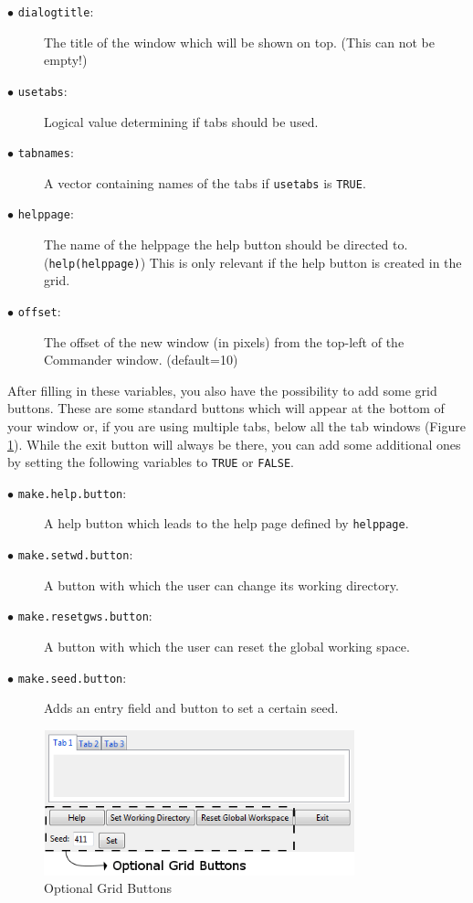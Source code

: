 \documentclass[a4paper]{article}\usepackage[]{graphicx}\usepackage[]{color}
\begin{document}
\begin{description}
  \item[$\bullet$ \texttt{dialogtitle}:] The title of the window which will be
  shown on top. (This can not be empty!)
  
  \item[$\bullet$ \texttt{usetabs}:] Logical value determining if tabs should be
  used.
  \item[$\bullet$ \texttt{tabnames}:] A vector containing names of the tabs if
  \verb|usetabs| is \verb|TRUE|. 
  
  \item[$\bullet$ \texttt{helppage}:] The name of the helppage the help button
  should be directed to. (\verb|help(helppage)|) This is only relevant if the
  help button is created in the grid.
  \item[$\bullet$ \texttt{offset}:] The offset of the new window (in pixels) from the top-left of the Commander window. (default=10)
\end{description}
\noindent After filling in these variables, you also have the possibility to add
some grid buttons. These are some standard buttons which will appear at the
bottom of your window or, if you are using multiple tabs, below all the tab
windows (Figure \ref{optionalgrid}). While the exit button will always be there,
you can add some additional ones by setting the following variables to
\verb|TRUE| or \verb|FALSE|. 
\begin{description}
  \item[$\bullet$ \texttt{make.help.button}:] A help button which leads to the
  help page defined by \verb|helppage|.
  \item[$\bullet$ \texttt{make.setwd.button}:] A button with which the user can
  change its working directory.
  \item[$\bullet$ \texttt{make.resetgws.button}:] A button with which the user
  can reset the global working space.
  \item[$\bullet$ \texttt{make.seed.button}:] Adds an entry field and button to
  set a certain seed.
\end{description}
\begin{figure}[H]
\centering
\includegraphics[width=9cm]{figures/optionalgrid.png}
\caption{Optional Grid Buttons \label{optionalgrid}}
\end{figure}
\end{document}

